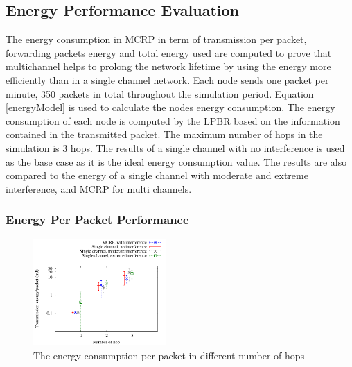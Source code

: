 \subsection{Energy Performance Evaluation}


The energy consumption in MCRP in term of transmission per packet, forwarding packets energy and total energy used are computed to prove that multichannel helps to prolong the network lifetime by using the energy more efficiently than in a single channel network. Each node sends one packet per minute, 350 packets in total throughout the simulation period. Equation \ref{energyModel} is used to calculate the nodes energy consumption. The energy consumption of each node is computed by the LPBR based on the information contained in the transmitted packet. The maximum number of hops in the simulation is 3 hops. The results of a single channel with no interference is used as the base case as it is the ideal energy consumption value. The results are also compared to the energy of a single channel with moderate and extreme interference, and MCRP for multi channels.


\subsubsection{Energy Per Packet Performance}

\begin{figure}
\centering
\includegraphics[width=0.45\textwidth]{figures/perPktEnergy.pdf}
\caption{The energy consumption per packet in different number of hops}
\label{fig:energyPerPkt}
\end{figure}

